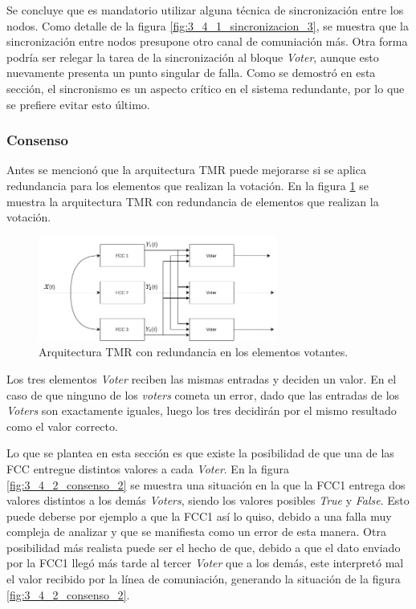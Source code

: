 Se concluye que es mandatorio utilizar alguna técnica de sincronización entre los nodos. Como detalle de la figura \ref{fig:3_4_1_sincronizacion_3}, se muestra que la sincronización entre nodos presupone otro canal de comuniación más. Otra forma podría ser relegar la tarea de la sincronización al bloque \textit{Voter}, aunque esto nuevamente presenta un punto singular de falla. Como se demostró en esta sección, el sincronismo es un aspecto crítico en el sistema redundante, por lo que se prefiere evitar esto último.

\subsubsection{Consenso}

Antes se mencionó que la arquitectura TMR puede mejorarse si se aplica redundancia para los elementos que realizan la votación. En la figura \ref{fig:3_4_2_consenso_1} se muestra la arquitectura TMR con redundancia de elementos que realizan la votación.

\begin{figure}[H]
    \centering
    \includegraphics[width=0.7\textwidth]{img/3_4_2_consenso_1.png}
    \caption{Arquitectura TMR con redundancia en los elementos votantes.}
    \label{fig:3_4_2_consenso_1}
\end{figure}

Los tres elementos \textit{Voter} reciben las mismas entradas y deciden un valor. En el caso de que ninguno de los \textit{voters} cometa un error, dado que las entradas de los \textit{Voters} son exactamente iguales, luego los tres decidirán por el mismo resultado como el valor correcto.

Lo que se plantea en esta sección es que existe la posibilidad de que una de las FCC entregue distintos valores a cada \textit{Voter}. En la figura \ref{fig:3_4_2_consenso_2} se muestra una situación en la que la FCC1 entrega dos valores distintos a los demás \textit{Voters}, siendo los valores posibles \textit{True} y \textit{False}. Esto puede deberse por ejemplo a que la FCC1 así lo quiso, debido a una falla muy compleja de analizar y que se manifiesta como un error de esta manera. Otra posibilidad más realista puede ser el hecho de que, debido a que el dato enviado por la FCC1 llegó más tarde al tercer \textit{Voter} que a los demás, este interpretó mal el valor recibido por la línea de comuniación, generando la situación de la figura \ref{fig:3_4_2_consenso_2}. 

